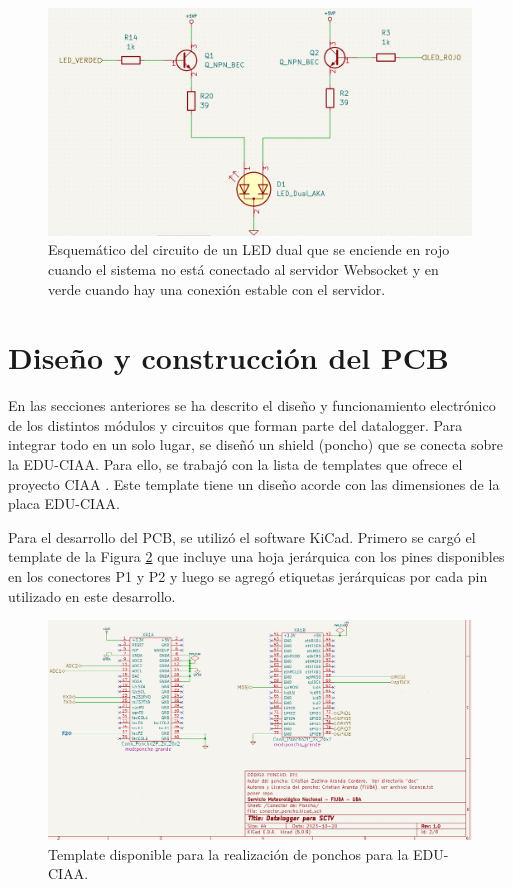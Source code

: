 \begin{figure}[H]
    \centering
    \includegraphics[width=0.95\linewidth]{Figuras/datalogger/Hardware/esquemLedStatusSocket.png}
    \caption{Esquemático del circuito de un LED dual que se enciende en rojo cuando el sistema no está conectado al servidor Websocket y en verde cuando hay una conexión estable con el servidor.}
    \label{fig:esquemLedStatusSocket}
\end{figure}



\section{Diseño y construcción del PCB}

En las secciones anteriores se ha descrito el diseño y funcionamiento electrónico de los distintos módulos y circuitos que forman parte del datalogger. Para integrar todo en un solo lugar, se diseñó un shield (poncho) que se conecta sobre la EDU-CIAA. Para ello, se trabajó con la lista de templates que ofrece el proyecto CIAA \cite{CIAA_Ponchos}. Este template tiene un diseño acorde con las dimensiones de la placa EDU-CIAA.

Para el desarrollo del PCB, se utilizó el software KiCad. Primero se cargó el template de la Figura \ref{fig:HojaTemplatePonchoCiaa} que incluye una hoja jerárquica con los pines disponibles en los conectores P1 y P2 y luego se agregó etiquetas jerárquicas por cada pin utilizado en este desarrollo.

\begin{figure}[H]
    \centering
    \includegraphics[width=0.95\linewidth]{Figuras/datalogger/Hardware/HojaTemplatePonchoCiaa.png}
    \caption{Template disponible para la realización de ponchos para la EDU-CIAA.}
    \label{fig:HojaTemplatePonchoCiaa}
\end{figure}


